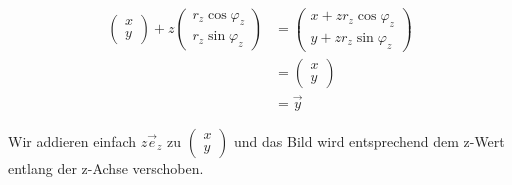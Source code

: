 \documentclass[a4paper]{article}
\begin{document}
\begin{displaymath}
\begin{align}
\begin{pmatrix}x\\y\end{pmatrix} + z\begin{pmatrix}r_z\cos\varphi_z\\r_z\sin\varphi_z\end{pmatrix} &= \begin{pmatrix}x+zr_{z}\cos\varphi_z\\y+zr_{z}\sin\varphi_z\end{pmatrix}\\ &= \begin{pmatrix}x\\y\end{pmatrix}\\ &= \vec{y}
\end{align}
\end{displaymath}

Wir addieren einfach $z\vec{e}_z$ zu $\begin{pmatrix}x\\y\end{pmatrix}$ und das Bild wird entsprechend dem z-Wert entlang der z-Achse verschoben. 
\end{document}
